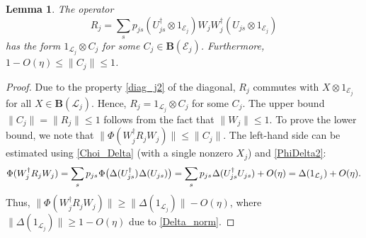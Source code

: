 \documentclass[12pt]{article}
\newcommand{\calE}{\mathcal{E}}
\newcommand{\calL}{\mathcal{L}}
\newcommand{\ts}{\mkern1mu}
\newcommand{\Bo}{\mathbf{B}}
\renewcommand{\le}{\leqslant}
\renewcommand{\ge}{\geqslant}
\newtheorem{Lemma}[Theorem]{Lemma}
\newtheorem[definition]{Definition}[Theorem]{Definition}
\newtheorem[remark]{Example}[Theorem]{Example}
\newtheorem[remark]{Remark}[Theorem]{Remark}
\newtheorem[remark]{Question}[Theorem]{Open question}
\newtheorem*[definition]{definition}{Definition}
\newtheorem*[remark]{example}{Example}
\newtheorem*[remark]{remark}{Remark}
\newtheorem*[remark]{question}{Open question}
\numberwithin{equation}{section}
\begin{document}
\begin{Lemma}\label{lem_RC}
The operator
\begin{equation}\label{R_def}
R_j =\sum_{s}p_{js}(U_{js}^{\dag}\otimes 1_{\calE_j})
W_jW_j^{\dag}(U_{js}\otimes 1_{\calE_j})
\end{equation}
has the form $1_{\calL_j}\otimes C_j$ for some $C_j\in\Bo(\calE_j)$. Furthermore, $1-O(\eta)\le\|C_j\|\le 1$.
\end{Lemma}
\begin{proof}
Due to the property \eqref{diag_j2} of the diagonal, $R_j$ commutes with $X\otimes 1_{\calE_j}$ for all $X\in\Bo(\calL_j)$. Hence, $R_j=1_{\calL_j}\otimes C_j$ for some $C_j$. The upper bound $\|C_j\|=\|R_j\|\le 1$ follows from the fact that $\|W_j\|\le 1$. To prove the lower bound, we note that $\|\Phi(W_j^{\dag}R_jW_j)\|\le\|C_j\|$. The left-hand side can be estimated using \eqref{Choi_Delta} (with a single nonzero $X_j$) and \eqref{PhiDelta2}:
\[
\Phi(W_j^{\dag}R_jW_j)
=\sum_{s}p_{js}\ts\Phi\bigl(\Delta(U_{js}^{\dag})\ts\Delta(U_{js})\bigr)
=\sum_{s}p_{js}\ts\Delta(U_{js}^{\dag}U_{js})+O(\eta)
=\Delta(1_{\calL_j})+O(\eta).
\]
Thus, $\|\Phi(W_j^{\dag}R_jW_j)\|\ge\|\Delta(1_{\calL_j})\|-O(\eta)$, where $\|\Delta(1_{\calL_j})\|\ge 1-O(\eta)$ due to \eqref{Delta_norm}.
\end{proof}
\end{document}
